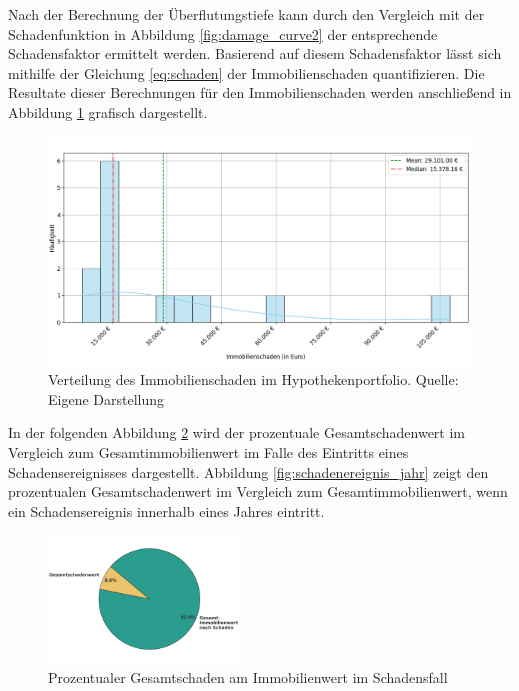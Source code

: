 Nach der Berechnung der Überflutungstiefe kann durch den Vergleich mit der Schadenfunktion in Abbildung \ref{fig:damage_curve2} der entsprechende Schadensfaktor ermittelt werden. Basierend auf diesem Schadensfaktor lässt sich mithilfe der Gleichung \ref{eq:schaden} der Immobilienschaden quantifizieren. Die Resultate dieser Berechnungen für den Immobilienschaden werden anschließend in Abbildung \ref{fig:schadenwert} grafisch dargestellt.
\begin{figure}[htbp]
    \centering
    \includegraphics[width=\textwidth]{figures/flutschaden.png}
    \caption{Verteilung des Immobilienschaden im Hypothekenportfolio. Quelle: Eigene Darstellung}
    \label{fig:schadenwert}
\end{figure}
\FloatBarrier
In der folgenden Abbildung \ref{fig:schadenereignis} wird der prozentuale Gesamtschadenwert im Vergleich zum Gesamtimmobilienwert im Falle des Eintritts eines Schadensereignisses dargestellt. Abbildung \ref{fig:schadenereignis_jahr} zeigt den prozentualen Gesamtschadenwert im Vergleich zum Gesamtimmobilienwert, wenn ein Schadensereignis innerhalb eines Jahres eintritt.\begin{figure}[H]
    \centering
    \includegraphics[width=0.45\textwidth]{figures/roundchartsloss.png}
    \caption{Prozentualer Gesamtschaden am Immobilienwert im Schadensfall}
    \label{fig:schadenereignis}
\end{figure}

